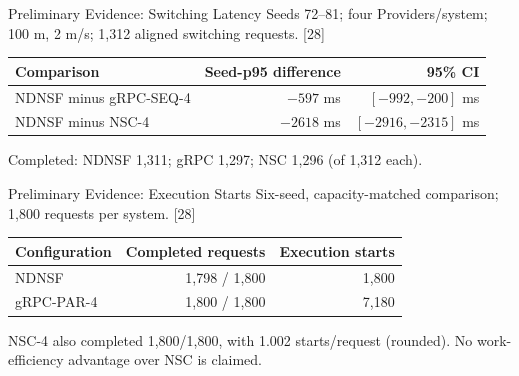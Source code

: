 \begin{frame}{Preliminary Evidence: Switching Latency}
\small
Seeds 72--81; four Providers/system; 100 m, 2 m/s; 1,312 aligned switching requests. [28]
\par\vspace{4mm}
\begin{tabularx}{\linewidth}{Xrr}
\toprule Comparison & Seed-p95 difference & 95\% CI\\\midrule
NDNSF minus gRPC-SEQ-4 & $-597$ ms & $[-992,-200]$ ms\\\midrule
NDNSF minus NSC-4 & $-2618$ ms & $[-2916,-2315]$ ms\\\bottomrule
\end{tabularx}
\vspace{2mm}\small Completed: NDNSF 1,311; gRPC 1,297; NSC 1,296 (of 1,312 each).
\vspace{2mm}
\end{frame}

\begin{frame}{Preliminary Evidence: Execution Starts}
\small Six-seed, capacity-matched comparison; 1,800 requests per system. [28]
\par\vspace{4mm}
\begin{tabularx}{\linewidth}{Xrr}
\toprule Configuration & Completed requests & Execution starts\\\midrule
NDNSF & 1,798 / 1,800 & 1,800\\\midrule
gRPC-PAR-4 & 1,800 / 1,800 & 7,180\\\bottomrule
\end{tabularx}
\vspace{3mm}\small NSC-4 also completed 1,800/1,800, with 1.002 starts/request (rounded). No work-efficiency advantage over NSC is claimed.
\vspace{3mm}
\end{frame}

